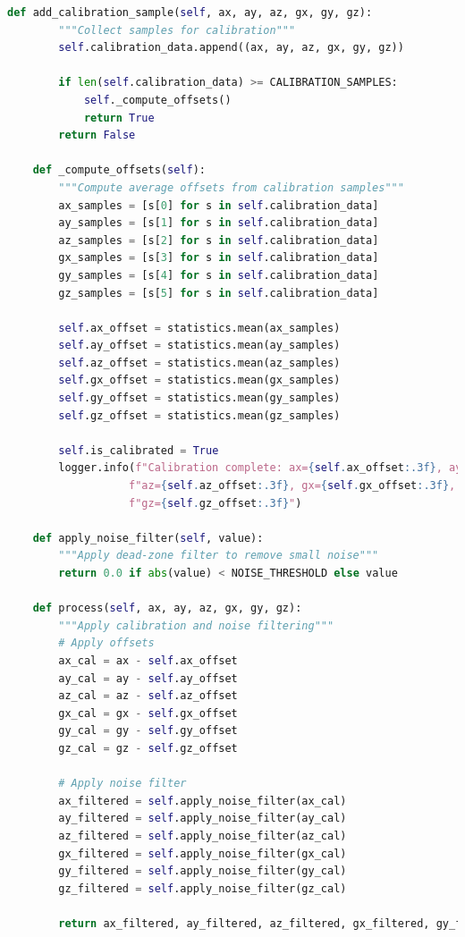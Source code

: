 \documentclass[conference]{IEEEtran}
\begin{document}
\begin{lstlisting}[language=Python]
    def add_calibration_sample(self, ax, ay, az, gx, gy, gz):
        """Collect samples for calibration"""
        self.calibration_data.append((ax, ay, az, gx, gy, gz))
        
        if len(self.calibration_data) >= CALIBRATION_SAMPLES:
            self._compute_offsets()
            return True
        return False
    
    def _compute_offsets(self):
        """Compute average offsets from calibration samples"""
        ax_samples = [s[0] for s in self.calibration_data]
        ay_samples = [s[1] for s in self.calibration_data]
        az_samples = [s[2] for s in self.calibration_data]
        gx_samples = [s[3] for s in self.calibration_data]
        gy_samples = [s[4] for s in self.calibration_data]
        gz_samples = [s[5] for s in self.calibration_data]
        
        self.ax_offset = statistics.mean(ax_samples)
        self.ay_offset = statistics.mean(ay_samples)
        self.az_offset = statistics.mean(az_samples)
        self.gx_offset = statistics.mean(gx_samples)
        self.gy_offset = statistics.mean(gy_samples)
        self.gz_offset = statistics.mean(gz_samples)
        
        self.is_calibrated = True
        logger.info(f"Calibration complete: ax={self.ax_offset:.3f}, ay={self.ay_offset:.3f}, "
                   f"az={self.az_offset:.3f}, gx={self.gx_offset:.3f}, gy={self.gy_offset:.3f}, "
                   f"gz={self.gz_offset:.3f}")
    
    def apply_noise_filter(self, value):
        """Apply dead-zone filter to remove small noise"""
        return 0.0 if abs(value) < NOISE_THRESHOLD else value
    
    def process(self, ax, ay, az, gx, gy, gz):
        """Apply calibration and noise filtering"""
        # Apply offsets
        ax_cal = ax - self.ax_offset
        ay_cal = ay - self.ay_offset
        az_cal = az - self.az_offset
        gx_cal = gx - self.gx_offset
        gy_cal = gy - self.gy_offset
        gz_cal = gz - self.gz_offset
        
        # Apply noise filter
        ax_filtered = self.apply_noise_filter(ax_cal)
        ay_filtered = self.apply_noise_filter(ay_cal)
        az_filtered = self.apply_noise_filter(az_cal)
        gx_filtered = self.apply_noise_filter(gx_cal)
        gy_filtered = self.apply_noise_filter(gy_cal)
        gz_filtered = self.apply_noise_filter(gz_cal)
        
        return ax_filtered, ay_filtered, az_filtered, gx_filtered, gy_filtered, gz_filtered
    

\end{lstlisting}
\end{document}
